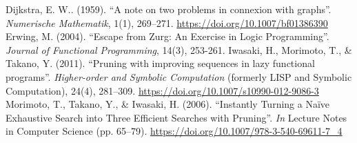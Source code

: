 \documentclass[journal,onecolumn]{IEEEtran}
\begin{document}
\begin{thebibliography}{6}
       Dijkstra, E. W.. (1959). ``A note on two problems in connexion with graphs''. \textit{Numerische Mathematik}, 1(1), 269–271. \url{https://doi.org/10.1007/bf01386390}
       Erwing, M. (2004). ``Escape from Zurg: An Exercise in Logic Programming''. \textit{Journal of Functional Programming}, 14(3), 253-261.
       Iwasaki, H., Morimoto, T., \& Takano, Y. (2011). ``Pruning with improving sequences in lazy functional programs''. \textit{Higher-order and Symbolic Computation} (formerly LISP and Symbolic Computation), 24(4), 281–309. \url{https://doi.org/10.1007/s10990-012-9086-3}
       Morimoto, T., Takano, Y., \& Iwasaki, H. (2006). ``Instantly Turning a Naïve Exhaustive Search into Three Efficient Searches with Pruning''. \textit{In} Lecture Notes in Computer Science (pp. 65–79). \url{https://doi.org/10.1007/978-3-540-69611-7_4}

\end{thebibliography}
              
\end{document}
